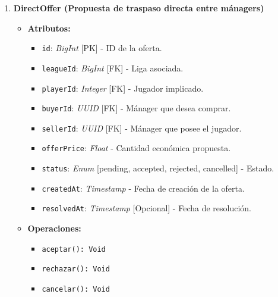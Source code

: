 \begin{enumerate}
    \item \textbf{DirectOffer (Propuesta de traspaso directa entre mánagers)}
    \begin{itemize}
        \item \textbf{Atributos:}
            \begin{itemize}
                \item \texttt{id}: \textit{BigInt} [PK] - ID de la oferta.
                \item \texttt{leagueId}: \textit{BigInt} [FK] - Liga asociada.
                \item \texttt{playerId}: \textit{Integer} [FK] - Jugador implicado.
                \item \texttt{buyerId}: \textit{UUID} [FK] - Mánager que desea comprar.
                \item \texttt{sellerId}: \textit{UUID} [FK] - Mánager que posee el jugador.
                \item \texttt{offerPrice}: \textit{Float} - Cantidad económica propuesta.
                \item \texttt{status}: \textit{Enum} [pending, accepted, rejected, cancelled] - Estado.
                \item \texttt{createdAt}: \textit{Timestamp} - Fecha de creación de la oferta.
                \item \texttt{resolvedAt}: \textit{Timestamp} [Opcional] - Fecha de resolución.
            \end{itemize}
        \item \textbf{Operaciones:}
            \begin{itemize}
                \item \texttt{aceptar(): Void}
                \item \texttt{rechazar(): Void}
                \item \texttt{cancelar(): Void}
            \end{itemize}
    \end{itemize}


\end{enumerate}
